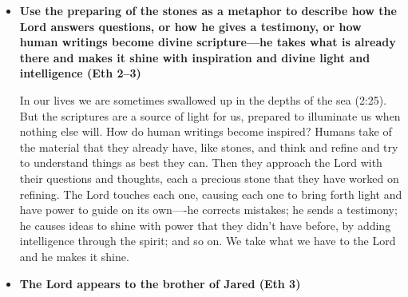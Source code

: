 \begin{itemize}
	The brother of Jared asks how they are going to \textit{steer} (19) without light. But they're inside the boat, and it's enclosed, so how could they steer whether they have light inside or not? By ``light'' he must mean, how are we going to know where we're going? This makes the story more interesting and the parallel to us more powerful---sometimes we're going to have to board barges in faith without being able to see where we're going at all. No light illuminates the forward path; all we can do is believe that we are being guided by the Lord in the proper way.
	
	Think of this story in comparison to Nephi's story of crossing the waters---the entire thing, from preparing the boat (Nephi had to learn how to build it/brother of Jared used his old boats as a model), to steering (Nephi had to steer vs. enclosed ship; see also 1N 18:13 vs. Eth 2:19), and so on.
	
	Notice the difference in the questions he asks about light---in 19 it's about steering, while in 22 it's about having light inside the vessel so they don't have to cross in darkness.
	
	Follow up on this with the information that it's 6:1--10.
	
\item \textbf{Use the preparing of the stones as a metaphor to describe how the Lord answers questions, or how he gives a testimony, or how human writings become divine scripture---he takes what is already there and makes it shine with inspiration and divine light and intelligence (Eth 2--3)}

	In our lives we are sometimes swallowed up in the depths of the sea (2:25). But the scriptures are a source of light for us, prepared to illuminate us when nothing else will. How do human writings become inspired? Humans take of the material that they already have, like stones, and think and refine and try to understand things as best they can. Then they approach the Lord with their questions and thoughts, each a precious stone that they have worked on refining. The Lord touches each one, causing each one to bring forth light and have power to guide on its own----he corrects mistakes; he sends a testimony; he causes ideas to shine with power that they didn't have before, by adding intelligence through the spirit; and so on. We take what we have to the Lord and he makes it shine.
	
\item \textbf{The Lord appears to the brother of Jared (Eth 3)}


\end{itemize}

